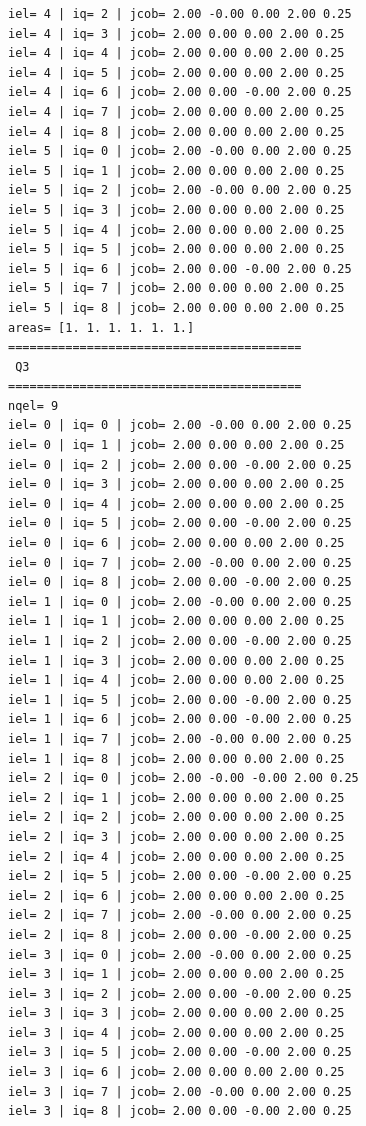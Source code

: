 \begin{tiny}
\begin{verbatim}
iel= 4 | iq= 2 | jcob= 2.00 -0.00 0.00 2.00 0.25
iel= 4 | iq= 3 | jcob= 2.00 0.00 0.00 2.00 0.25
iel= 4 | iq= 4 | jcob= 2.00 0.00 0.00 2.00 0.25
iel= 4 | iq= 5 | jcob= 2.00 0.00 0.00 2.00 0.25
iel= 4 | iq= 6 | jcob= 2.00 0.00 -0.00 2.00 0.25
iel= 4 | iq= 7 | jcob= 2.00 0.00 0.00 2.00 0.25
iel= 4 | iq= 8 | jcob= 2.00 0.00 0.00 2.00 0.25
iel= 5 | iq= 0 | jcob= 2.00 -0.00 0.00 2.00 0.25
iel= 5 | iq= 1 | jcob= 2.00 0.00 0.00 2.00 0.25
iel= 5 | iq= 2 | jcob= 2.00 -0.00 0.00 2.00 0.25
iel= 5 | iq= 3 | jcob= 2.00 0.00 0.00 2.00 0.25
iel= 5 | iq= 4 | jcob= 2.00 0.00 0.00 2.00 0.25
iel= 5 | iq= 5 | jcob= 2.00 0.00 0.00 2.00 0.25
iel= 5 | iq= 6 | jcob= 2.00 0.00 -0.00 2.00 0.25
iel= 5 | iq= 7 | jcob= 2.00 0.00 0.00 2.00 0.25
iel= 5 | iq= 8 | jcob= 2.00 0.00 0.00 2.00 0.25
areas= [1. 1. 1. 1. 1. 1.]
=========================================
 Q3
=========================================
nqel= 9
iel= 0 | iq= 0 | jcob= 2.00 -0.00 0.00 2.00 0.25
iel= 0 | iq= 1 | jcob= 2.00 0.00 0.00 2.00 0.25
iel= 0 | iq= 2 | jcob= 2.00 0.00 -0.00 2.00 0.25
iel= 0 | iq= 3 | jcob= 2.00 0.00 0.00 2.00 0.25
iel= 0 | iq= 4 | jcob= 2.00 0.00 0.00 2.00 0.25
iel= 0 | iq= 5 | jcob= 2.00 0.00 -0.00 2.00 0.25
iel= 0 | iq= 6 | jcob= 2.00 0.00 0.00 2.00 0.25
iel= 0 | iq= 7 | jcob= 2.00 -0.00 0.00 2.00 0.25
iel= 0 | iq= 8 | jcob= 2.00 0.00 -0.00 2.00 0.25
iel= 1 | iq= 0 | jcob= 2.00 -0.00 0.00 2.00 0.25
iel= 1 | iq= 1 | jcob= 2.00 0.00 0.00 2.00 0.25
iel= 1 | iq= 2 | jcob= 2.00 0.00 -0.00 2.00 0.25
iel= 1 | iq= 3 | jcob= 2.00 0.00 0.00 2.00 0.25
iel= 1 | iq= 4 | jcob= 2.00 0.00 0.00 2.00 0.25
iel= 1 | iq= 5 | jcob= 2.00 0.00 -0.00 2.00 0.25
iel= 1 | iq= 6 | jcob= 2.00 0.00 -0.00 2.00 0.25
iel= 1 | iq= 7 | jcob= 2.00 -0.00 0.00 2.00 0.25
iel= 1 | iq= 8 | jcob= 2.00 0.00 0.00 2.00 0.25
iel= 2 | iq= 0 | jcob= 2.00 -0.00 -0.00 2.00 0.25
iel= 2 | iq= 1 | jcob= 2.00 0.00 0.00 2.00 0.25
iel= 2 | iq= 2 | jcob= 2.00 0.00 0.00 2.00 0.25
iel= 2 | iq= 3 | jcob= 2.00 0.00 0.00 2.00 0.25
iel= 2 | iq= 4 | jcob= 2.00 0.00 0.00 2.00 0.25
iel= 2 | iq= 5 | jcob= 2.00 0.00 -0.00 2.00 0.25
iel= 2 | iq= 6 | jcob= 2.00 0.00 0.00 2.00 0.25
iel= 2 | iq= 7 | jcob= 2.00 -0.00 0.00 2.00 0.25
iel= 2 | iq= 8 | jcob= 2.00 0.00 -0.00 2.00 0.25
iel= 3 | iq= 0 | jcob= 2.00 -0.00 0.00 2.00 0.25
iel= 3 | iq= 1 | jcob= 2.00 0.00 0.00 2.00 0.25
iel= 3 | iq= 2 | jcob= 2.00 0.00 -0.00 2.00 0.25
iel= 3 | iq= 3 | jcob= 2.00 0.00 0.00 2.00 0.25
iel= 3 | iq= 4 | jcob= 2.00 0.00 0.00 2.00 0.25
iel= 3 | iq= 5 | jcob= 2.00 0.00 -0.00 2.00 0.25
iel= 3 | iq= 6 | jcob= 2.00 0.00 0.00 2.00 0.25
iel= 3 | iq= 7 | jcob= 2.00 -0.00 0.00 2.00 0.25
iel= 3 | iq= 8 | jcob= 2.00 0.00 -0.00 2.00 0.25

\end{verbatim}
\end{tiny}
